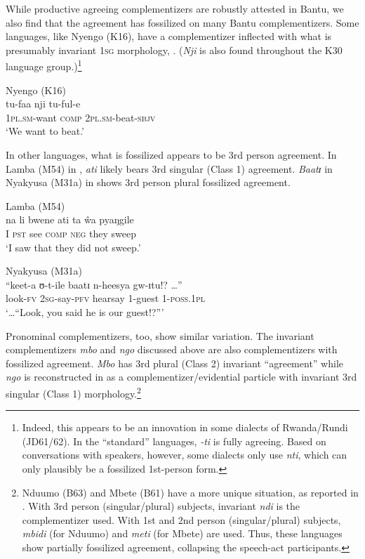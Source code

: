 \documentclass[output=paper,colorlinks,citecolor=brown,
]{langscibook}
\begin{document}
While productive agreeing complementizers are robustly attested in Bantu, we also find that the agreement has fossilized on many Bantu complementizers. Some languages, like Nyengo (K16),  have a complementizer inflected with what is presumably invariant 1\textsc{sg} morphology, . (\textit{Nji} is also found throughout the K30 language group.)\footnote{Indeed, this appears to be an innovation in some dialects of Rwanda/Rundi (JD61/62). In the ``standard'' languages, \textit{-ti} is fully agreeing. Based on conversations with speakers, however, some dialects only use \textit{nti}, which can only plausibly be a fossilized 1st-person form.}

\ea\label{ex:gluckman:nyengo.comp} Nyengo (K16) \citep[166]{Lisimba:1982} \\
	\gll tu-faa nji tu-ful-e\\
	1\textsc{pl.sm}-want \textsc{comp} 2\textsc{pl.sm}-beat-\textsc{sbjv}\\
	\glt `We want to beat.' 

\z



In other languages, what is fossilized appears to be 3rd person agreement. In Lamba (M54)  in , \textit{ati} likely bears 3rd singular (Class 1) agreement.  \textit{Baatɪ} in Nyakyusa (M31a) in  shows 3rd person plural fossilized agreement.

\ea 
	\begin{xlist}
	\ex \label{ex:gluckman:lamba.comp} Lamba (M54) \citep[144]{Doke:1922} \\
	\gll na li bwene ati ta \^{w}a pyaŋgile\\
	I \textsc{pst} see \textsc{comp} \textsc{neg} they sweep\\
	\glt `I saw that they did not sweep.'
	
	\ex \label{ex:gluckman:nyak.comp} Nyakyusa (M31a) \citep[315]{Persohn:2017} \\
	\gll  {\ldots}  ``keet-a ʊ-t-ile baatɪ n-heesya gw-ɪtu!? \ldots''\\
	{ }  look-\textsc{fv} 2\textsc{sg}-say-\textsc{pfv} hearsay 1-guest 1-\textsc{poss.1pl}\\
	\glt `\ldots ``Look, you said he is our guest!?''' 
	\end{xlist}
\z

Pronominal complementizers, too, show similar variation. The invariant complementizers \textit{mbo} and \textit{ngo} discussed above are also  complementizers  with fossilized agreement. \textit{Mbo} has 3rd plural (Class 2) invariant  ``agreement'' while \textit{ngo} is reconstructed in \citet{Botne:1995} as a complementizer/evidential particle with invariant 3rd singular (Class 1) morphology.\footnote{Nduumo (B63) and Mbete (B61) have a more unique situation, as reported in \citet{Adam:1954}. With 3rd person (singular/plural) subjects, invariant \textit{ndi} is the complementizer used. With 1st and 2nd person (singular/plural) subjects, \textit{mbidi} (for Nduumo) and \textit{meti} (for Mbete) are used. Thus, these languages show partially fossilized agreement, collapsing the speech-act participants.}
\end{document}
